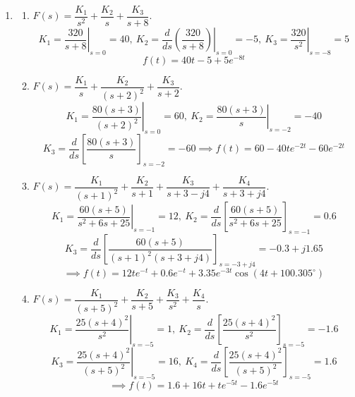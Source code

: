 \documentclass[11pt]{article}
\begin{document}
\begin{enumerate}[leftmargin=*,label=\textbf{2.\arabic*.}]
\begin{enumerate}[label=\textbf{\alph*)}]
\item $F(s)=\dfrac{K_1}{s}+\dfrac{K_2}{s+5-j8}+\dfrac{K_2^*}{s+5+j8}$
\[K_1=\left.\dfrac{-s^2+52s+445}{s^2+10s+89}\right|_{s=0}=5,\:K_2=\left.\dfrac{-s^2+52s+445}{s(s+5+j8)}\right|_{s=-5+j8}=-3+j2\]
\[\boxed{f(t)=5+7.21e^{-5t}\cos(8t-146.31^\circ)}\]

\item $F(s)=\dfrac{K_1}{s+6}+\dfrac{K_2}{s+2-4j}+\dfrac{K_2^*}{s+2+4j}$.
\[K_1=\left.\frac{14s^2+56s+152}{s^2+4s+20}\right|_{s=-6}=10,\:K_2=\left.\frac{14s^2+56s+152}{(s+2+j4)(s+6)}\right|_{s=-2+j4}=2+j2\]
\[\implies\boxed{f(t)=10e^{-6t}+5.66e^{-2t}\cos(4t+45^\circ)}\]

\item $F(s)=\dfrac{K_1}{s+5-j3}+\dfrac{K_1^*}{s+5+j3}+\dfrac{K_2}{s+4-j2}+\dfrac{K_2^*}{s+4+j2}$
\[K_1=\left.\frac{8(s+1)^2}{(s+5+j3)(s^2+8s+20)}\right|_{s=-5+j3}=3.54-j2.97\]
\[K_2=\left.\frac{8(s+1)^2}{(s^2+10s+34)(s+4+2j)}\right|_{s=-4+j2}=-3.54+j0.69\]
\[\boxed{f(t)=9.25e^{-5t}\cos(3t-40.04^\circ)+7.22e^{-4t}\cos(2t+168.93^\circ)}\]
\end{enumerate}.

\item \begin{enumerate}[label=\textbf{\alph*)}]

\item $F(s)=\dfrac{K_1}{s^2}+\dfrac{K_2}s+\dfrac{K_3}{s+8}$.
\[K_1=\left.\dfrac{320}{s+8}\right|_{s=0}=40,\:K_2=\left.\dfrac d{ds}\left(\dfrac{320}{s+8}\right)\right|_{s=0}=-5,\:K_3=\left.\dfrac{320}{s^2}\right|_{s=-8}=5\]
\[\boxed{f(t)=40t-5+5e^{-8t}}\]

\item $F(s)=\dfrac{K_1}{s}+\dfrac{K_2}{(s+2)^2}+\dfrac{K_3}{s+2}$.
\[K_1=\left.\dfrac{80(s+3)}{(s+2)^2}\right|_{s=0}=60,\:K_2=\left.\dfrac{80(s+3)}{s}\right|_{s=-2}=-40\]
\[K_3=\frac d{ds}\left[\dfrac{80(s+3)}{s}\right]_{s=-2}=-60\implies \boxed{f(t)=60-40te^{-2t}-60e^{-2t}}\]

\item $F(s)=\dfrac{K_1}{(s+1)^2}+\dfrac{K_2}{s+1}+\dfrac{K_3}{s+3-j4}+\dfrac{K_4}{s+3+j4}$.
\[K_1=\left.\dfrac{60(s+5)}{s^2+6s+25}\right|_{s=-1}=12,\:K_2=\frac d{ds}\left[\dfrac{60(s+5)}{s^2+6s+25}\right]_{s=-1}=0.6\]
\[K_3=\frac d{ds}\left[\dfrac{60(s+5)}{(s+1)^2(s+3+j4)}\right]_{s=-3+j4}=-0.3+j1.65\]
\[\implies \boxed{f(t)=12te^{-t}+0.6e^{-t}+3.35e^{-3t}\cos(4t+100.305^\circ)}\]

\item $F(s)=\dfrac{K_1}{(s+5)^2}+\dfrac{K_2}{s+5}+\dfrac{K_3}{s^2}+\dfrac{K_4}{s}$.
\[K_1=\left.\dfrac{25(s+4)^2}{s^2}\right|_{s=-5}=1,\:K_2=\frac d{ds}\left[\dfrac{25(s+4)^2}{s^2}\right]_{s=-5}=-1.6\]
\[K_3=\left.\dfrac{25(s+4)^2}{(s+5)^2}\right|_{s=-5}=16,\:K_4=\frac d{ds}\left[\dfrac{25(s+4)^2}{(s+5)^2}\right]_{s=-5}=1.6\]
\[\implies \boxed{f(t)=1.6+16t+te^{-5t}-1.6e^{-5t}}\]


\end{enumerate}
\end{enumerate}
\end{document}
